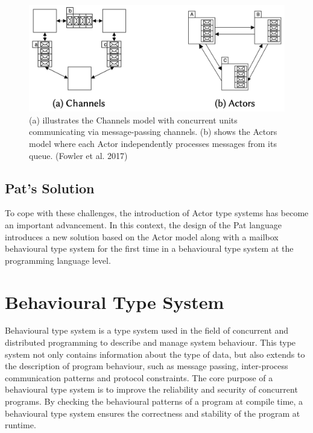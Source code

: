 \documentclass{l4proj}
\begin{document}
\begin{figure}
    \centering
    \includegraphics[width=0.7\linewidth]{images/channel_actor.png}    
    \caption{ (a) illustrates the Channels model with concurrent units communicating via message-passing channels. (b) shows the Actors model where each Actor independently processes messages from its queue. (Fowler et al. 2017)
    }
    \label{fig:channel_actor} 
\end{figure}

\subsection{Pat's Solution}
To cope with these challenges, the introduction of Actor type systems has become an important advancement. In this context, the design of the Pat language introduces a new solution based on the Actor model along with a mailbox behavioural type system for the first time in a behavioural type system at the programming language level.


\section{Behavioural Type System}
Behavioural type system is a type system used in the field of concurrent and distributed programming to describe and manage system behaviour. This type system not only contains information about the type of data, but also extends to the description of program behaviour, such as message passing, inter-process communication patterns and protocol constraints. The core purpose of a behavioural type system is to improve the reliability and security of concurrent programs. By checking the behavioural patterns of a program at compile time, a behavioural type system ensures the correctness and stability of the program at runtime.
\end{document}
